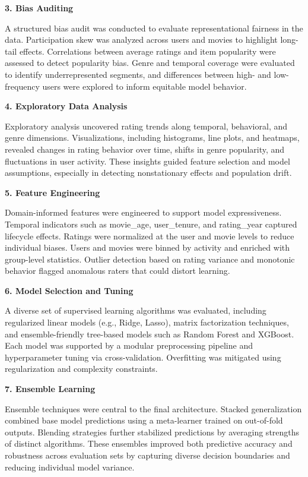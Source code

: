 \documentclass[
]{article}
\begin{document}
\textbf{3. Bias Auditing}

A structured bias audit was conducted to evaluate representational
fairness in the data. Participation skew was analyzed across users and
movies to highlight long-tail effects. Correlations between average
ratings and item popularity were assessed to detect popularity bias.
Genre and temporal coverage were evaluated to identify underrepresented
segments, and differences between high- and low-frequency users were
explored to inform equitable model behavior.

\textbf{4. Exploratory Data Analysis}

Exploratory analysis uncovered rating trends along temporal, behavioral,
and genre dimensions. Visualizations, including histograms, line plots,
and heatmaps, revealed changes in rating behavior over time, shifts in
genre popularity, and fluctuations in user activity. These insights
guided feature selection and model assumptions, especially in detecting
nonstationary effects and population drift.

\textbf{5. Feature Engineering}

Domain-informed features were engineered to support model
expressiveness. Temporal indicators such as movie\_age, user\_tenure,
and rating\_year captured lifecycle effects. Ratings were normalized at
the user and movie levels to reduce individual biases. Users and movies
were binned by activity and enriched with group-level statistics.
Outlier detection based on rating variance and monotonic behavior
flagged anomalous raters that could distort learning.

\textbf{6. Model Selection and Tuning}

A diverse set of supervised learning algorithms was evaluated, including
regularized linear models (e.g., Ridge, Lasso), matrix factorization
techniques, and ensemble-friendly tree-based models such as Random
Forest and XGBoost. Each model was supported by a modular preprocessing
pipeline and hyperparameter tuning via cross-validation. Overfitting was
mitigated using regularization and complexity constraints.

\textbf{7. Ensemble Learning}

Ensemble techniques were central to the final architecture. Stacked
generalization combined base model predictions using a meta-learner
trained on out-of-fold outputs. Blending strategies further stabilized
predictions by averaging strengths of distinct algorithms. These
ensembles improved both predictive accuracy and robustness across
evaluation sets by capturing diverse decision boundaries and reducing
individual model variance.
\end{document}
